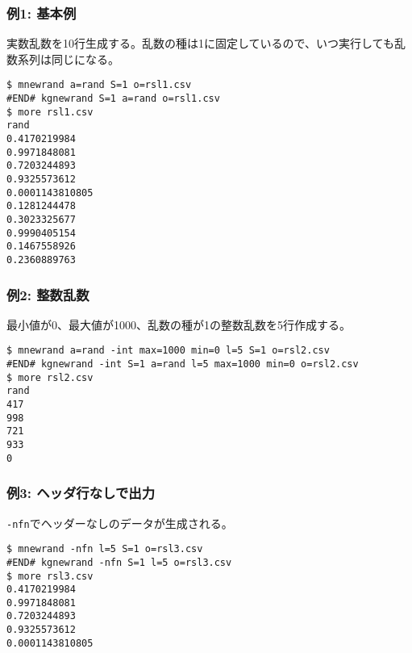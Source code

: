 \subsubsection*{例1: 基本例}

実数乱数を10行生成する。乱数の種は1に固定しているので、いつ実行しても乱数系列は同じになる。


\begin{Verbatim}[baselinestretch=0.7,frame=single]
$ mnewrand a=rand S=1 o=rsl1.csv
#END# kgnewrand S=1 a=rand o=rsl1.csv
$ more rsl1.csv
rand
0.4170219984
0.9971848081
0.7203244893
0.9325573612
0.0001143810805
0.1281244478
0.3023325677
0.9990405154
0.1467558926
0.2360889763
\end{Verbatim}
\subsubsection*{例2: 整数乱数}

最小値が0、最大値が1000、乱数の種が1の整数乱数を5行作成する。


\begin{Verbatim}[baselinestretch=0.7,frame=single]
$ mnewrand a=rand -int max=1000 min=0 l=5 S=1 o=rsl2.csv
#END# kgnewrand -int S=1 a=rand l=5 max=1000 min=0 o=rsl2.csv
$ more rsl2.csv
rand
417
998
721
933
0
\end{Verbatim}
\subsubsection*{例3: ヘッダ行なしで出力}

\verb|-nfn|でヘッダーなしのデータが生成される。


\begin{Verbatim}[baselinestretch=0.7,frame=single]
$ mnewrand -nfn l=5 S=1 o=rsl3.csv
#END# kgnewrand -nfn S=1 l=5 o=rsl3.csv
$ more rsl3.csv
0.4170219984
0.9971848081
0.7203244893
0.9325573612
0.0001143810805
\end{Verbatim}
